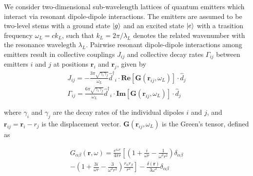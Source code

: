\documentclass[aps,pra,superscriptaddress,twocolumn]{revtex4-1}
\newcommand{\rr}{\mathbf{r}}
\newcommand{\commentTP}[1]{\texttt{\color{green}[#1]}}
\begin{document}
We consider two-dimensional sub-wavelength lattices of quantum emitters which interact via resonant dipole-dipole interactions. The emitters are assumed to be two-level stems with a ground state $\ket{g}$ and an excited state $\ket{e}$ with a trasition frequency $\omega_L = c k_L$, such that $k_L = 2\pi/\lambda_L$ denotes the related wavenumber with the resonance wavelegth $\lambda_L$. Pairwise resonant dipole-dipole interactions among emitters result in collective couplings $J_{ij}$ and collective decay rates $\Gamma_{ij}$ between emitters $i$ and $j$ at positions $\rr_i$ and $\rr_j$, given by 
\begin{subequations}
    \begin{align} J_{ij} = -\frac{3\pi \sqrt{\gamma_i \gamma_j}}{\omega_L} {\hat{d}^\dagger}_i \cdot \textbf{Re} [\textbf{G}(\textbf{r}_{ij}, \omega_L)] \cdot \hat{d}_j 
    \label{eqn:J} \\
    \Gamma_{ij} = \frac{6\pi \sqrt{\gamma_i \gamma_j}}{\omega_L} {\hat{d}^\dagger}_i \cdot \textbf{Im} [\textbf{G}(\textbf{r}_{ij},\omega_L)] \cdot \hat{d}_j 
    \label{eqn:Gamma} 
    \end{align}
\end{subequations}

where $\gamma_i$ and $\gamma_j$ are the decay rates of the individual dipoles $i$ and $j$, and $\rr_{ij} = \rr_i - r_j$ is the displacement vector. $\textbf{G}(\textbf{r}_{ij}, \omega_L)$ is the Green's tensor, defined as 

\begin{multline} 
    G_{\alpha\beta} (\textbf{r}, \omega) = \frac{e^{i\omega r}}{4\pi r} \left[ \left( 1 + \frac{i}{\omega r} - \frac{1}{\omega^2 r^2} \right) \delta_{\alpha\beta}
    \right. \\ \left. 
    - \left( 1 + \frac{3i}{\omega r} - \frac{3}{\omega^2 r^2} \right) \frac{r_\alpha r_\beta}{r^2} \right] - \frac{\delta(\textbf{r})}{3\omega^2} \delta_{\alpha\beta} 
    \label{eqn:Green}
\end{multline}
\end{document}
